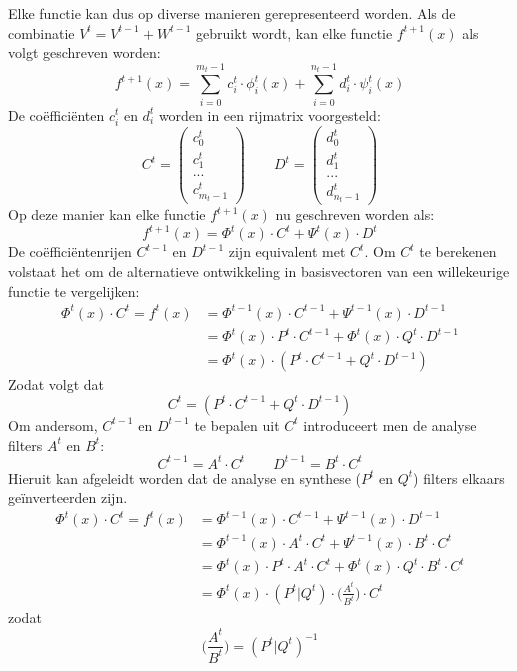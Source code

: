 \begin{enumerate}
{\begin{itemize}
			Elke functie kan dus op diverse manieren gerepresenteerd worden. Als de combinatie $V^t = V^{t - 1} + W^{t - 1}$ gebruikt wordt, kan elke functie $f^{t + 1}(x)$ als volgt geschreven worden:
			$$f^{t+1}(x) = \sum_{i=0}^{m_t - 1} c_i^t \cdot \phi^t_i(x) + \sum_{i=0}^{n_t - 1} d_i^t \cdot \psi^t_i(x)$$
			De coëfficiënten $c_i^t$ en $d_i^t$ worden in een rijmatrix voorgesteld:
		$$C^t = \begin{pmatrix} c_0^t \\ c_1^t \\ ... \\ c^t_{m_t - 1}\end{pmatrix}\qquad D^t = \begin{pmatrix} d_0^t \\ d_1^t \\ ... \\ d^t_{n_t - 1}\end{pmatrix}$$
			Op deze manier kan elke functie $f^{t + 1}(x)$ nu geschreven worden als:
			$$f^{t + 1}(x) = \Phi^t(x) \cdot C^t + \Psi^t(x) \cdot D^t$$
			De coëfficiëntenrijen $C^{t - 1}$ en $D^{t - 1}$ zijn equivalent met $C^t$. Om $C^t$ te berekenen volstaat het om de alternatieve ontwikkeling in basisvectoren van een willekeurige functie te vergelijken:
			\begin{equation*}
				\begin{split}
					\Phi^t(x) \cdot C^t = f^t(x) & = \Phi^{t-1}(x) \cdot C^{t-1} + \Psi^{t-1}(x) \cdot D^{t-1} \\
												 & = \Phi^{t}(x) \cdot P^t \cdot C^{t-1} + \Phi^{t}(x) \cdot Q^t \cdot D^{t-1} \\
												 & = \Phi^{t}(x) \cdot (P^t\cdot C^{t - 1} + Q^t \cdot D^{t - 1})
				\end{split}
			\end{equation*}
			Zodat volgt dat $$C^t = (P^t\cdot C^{t - 1} + Q^t \cdot D^{t - 1})$$
			Om andersom, $C^{t - 1}$ en $D^{t - 1}$ te bepalen uit $C^t$ introduceert men de analyse filters $A^t$ en $B^t$:
			$$C^{t - 1} = A^t\cdot C^t\qquad D^{t - 1} = B^t\cdot C^t$$
			Hieruit kan afgeleidt worden dat de analyse en synthese ($P^t$ en $Q^t$) filters elkaars geïnverteerden zijn.
			\begin{equation*}
				\begin{split}
					\Phi^t(x) \cdot C^t = f^t(x) & = \Phi^{t-1}(x) \cdot C^{t-1} + \Psi^{t-1}(x) \cdot D^{t-1} \\
												 & = \Phi^{t-1}(x) \cdot A^t \cdot C^t + \Psi^{t-1}(x) \cdot B^t \cdot C^t \\
												 & = \Phi^{t}(x) \cdot P^t \cdot A^t \cdot C^t + \Phi^{t}(x) \cdot Q^t \cdot B^t \cdot C^t \\
												 & = \Phi^{t}(x) \cdot (P^t  | Q^t) \cdot \bigg(\frac{A^t}{B^t}\bigg) \cdot C^t				
				\end{split}
			\end{equation*}
			zodat
			$$\bigg(\frac{A^t}{B^t}\bigg) = (P^t  | Q^t)^{-1}$$


\end{itemize}}
\end{enumerate}
